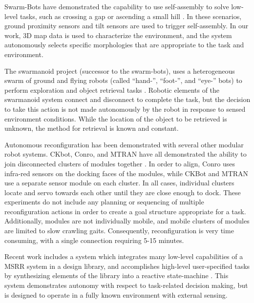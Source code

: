 \documentclass[conference]{IEEEtran}
\begin{document}
Swarm-Bots have demonstrated the capability to use self-assembly to solve low-level tasks, such as crossing a gap \cite{gross2006autonomous} or ascending a small hill \cite{o2010self}.  In these scenarios, ground proximity sensors and tilt sensors are used to trigger self-assembly.  In our work, 3D map data is used to characterize the environment, and the system autonomously selects specific morphologies that are appropriate to the task and environment. 

The swarmanoid project (successor to the swarm-bots), uses a heterogeneous swarm of ground and flying robots (called ``hand-'', ``foot-'', and ``eye-'' bots) to perform exploration and object retrieval tasks  \cite{Dorigo2013}. Robotic elements of the swarmanoid system connect and disconnect to complete the task, but the decision to take this action is not made autonomously by the robot in response to sensed environment conditions. While the location of the object to be retrieved is unknown, the method for retrieval is known and constant.

Autonomous reconfiguration has been demonstrated with several other modular robot systems. CKbot, Conro, and MTRAN have all demonstrated the ability to join disconnected clusters of modules together \cite{Yim2007, Rubenstein2004,Murata2006}. In order to align, Conro uses infra-red sensors on the docking faces of the modules, while CKBot and MTRAN use a separate sensor module on each cluster.  In all cases, individual clusters locate and servo towards each other until they are close enough to dock. These experiments do not include any planning or sequencing of multiple reconfiguration actions in order to create a goal structure appropriate for a task.  Additionally,  modules are not individually mobile, and mobile clusters of modules are limited to slow crawling gaits.  Consequently, reconfiguration is very time consuming, with a single connection requiring 5-15 minutes.


Recent work includes a system which integrates many low-level capabilities of a MSRR system in a design library, and accomplishes high-level user-specified tasks by synthesizing elements of the library into a reactive state-machine \cite{Jing2016}. This system demonstrates autonomy with respect to task-related decision making, but is designed to operate in a fully known environment with external sensing.
\end{document}
